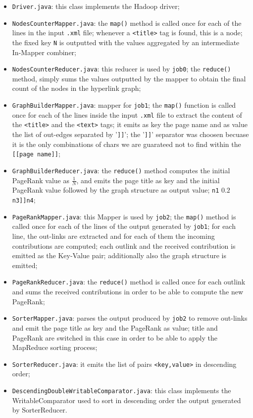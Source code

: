 \documentclass[11pt,a4paper]{article}
\begin{document}
\begin{itemize}
    \item \texttt{Driver.java}: this class implements the Hadoop driver;
    \item \texttt{NodesCounterMapper.java}: the \texttt{map()} method is called once for each of the lines in the input \texttt{.xml} file; whenever a \texttt{<title>} tag is found, this is a node; the fixed key \texttt{N} is outputted with the values aggregated by an intermediate In-Mapper combiner;
    \item \texttt{NodesCounterReducer.java}: 
    this reducer is used by \texttt{job0}; the \texttt{reduce()} method, simply sums the values outputted by the mapper to obtain the final count of the nodes in the hyperlink graph;
    \item \texttt{GraphBuilderMapper.java}: mapper for \texttt{job1}; the \texttt{map()} function is called once for each of the lines inside the input \texttt{.xml} file to extract the content of the \texttt{<title>} and the \texttt{<text>} tags; it emits as key the page name and as value the list of out-edges separated by '\texttt{]]}'; the '\texttt{]]}' separator was choosen becuase it is the only combinations of chars we are guarateed not to find within the \texttt{[[page name]]};
    \item \texttt{GraphBuilderReducer.java}: the \texttt{reduce()} method computes the initial PageRank value as $\frac{1}{N}$, and emits the page title as key and the initial PageRank value followed by the graph structure as output value;
    \texttt{n1} $0.2$ \texttt{n3]]n4};
    \item \texttt{PageRankMapper.java}: this Mapper is used by \texttt{job2}; the \texttt{map()} method is called once for each of the lines of the output generated by \texttt{job1}; for each line, the out-links are extracted and for each of them the incoming contributions are computed; each outlink and the received contribution is emitted as the Key-Value pair; additionally also the graph structure is emitted;
    \item \texttt{PageRankReducer.java}: the \texttt{reduce()} method is called once for each outlink and sums the received contributions in order to be able to compute the new PageRank;
    \item \texttt{SorterMapper.java}: parses the output produced by \texttt{job2} to remove out-links and emit the page title as key and the PageRank as value; title and PageRank are switched in this case in order to be able to apply the MapReduce sorting process;
    \item \texttt{SorterReducer.java}: it emits the list of pairs \texttt{<key,value>} in descending order;
    \item \texttt{DescendingDoubleWritableComparator.java}: this class implements the WritableComparator used to sort in descending order the output generated by SorterReducer.
\end{itemize}
\end{document}
